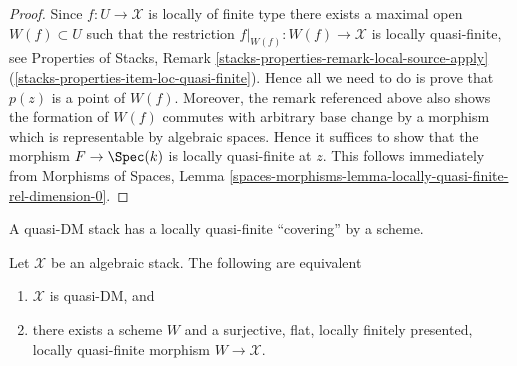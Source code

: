 \begin{proof}
Since $f : U \to \mathcal{X}$ is locally of finite type there exists a
maximal open $W(f) \subset U$ such that the restriction
$f|_{W(f)} : W(f) \to \mathcal{X}$ is locally quasi-finite, see
Properties of Stacks, Remark
\ref{stacks-properties-remark-local-source-apply}
(\ref{stacks-properties-item-loc-quasi-finite}).
Hence all we need to do is prove that $p(z)$ is a point of $W(f)$.
Moreover, the remark referenced above also shows the formation of $W(f)$
commutes with arbitrary base change by a morphism which is representable
by algebraic spaces. Hence it suffices to show that the morphism
$F \to \Spec(k)$ is locally quasi-finite at $z$. This follows
immediately from
Morphisms of Spaces,
Lemma \ref{spaces-morphisms-lemma-locally-quasi-finite-rel-dimension-0}.
\end{proof}

\noindent
A quasi-DM stack has a locally quasi-finite ``covering'' by a scheme.

\begin{theorem}
\label{theorem-quasi-DM}
Let $\mathcal{X}$ be an algebraic stack. The following are equivalent
\begin{enumerate}
\item $\mathcal{X}$ is quasi-DM, and
\item there exists a scheme $W$ and a surjective, flat, locally finitely
presented, locally quasi-finite morphism $W \to \mathcal{X}$.
\end{enumerate}
\end{theorem}


